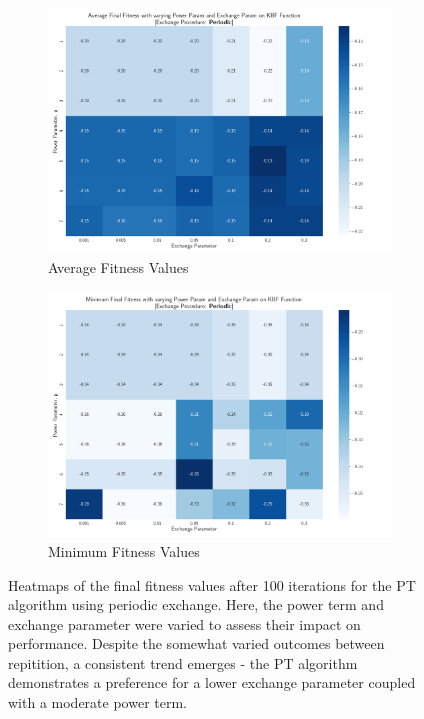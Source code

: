 \documentclass[10pt]{article}
\begin{document}
\begin{multicols}{2}
\begin{figure}[H]
    \centering
    \begin{subfigure}{0.46\textwidth}
        \centering
        \includegraphics[width=\textwidth]{../figures/Permanent Images/PT_Avg_Fitness_Heatmap_Periodic.png}
        \caption{Average Fitness Values}
        \label{fig:avg_periodic_heatmap}
    \end{subfigure}
    \begin{subfigure}{0.46\textwidth}
        \centering
        \includegraphics[width=\textwidth]{../figures/Permanent Images/PT_Min_Fitness_Heatmap_Periodic.png}
        \caption{Minimum Fitness Values}
        \label{fig:min_periodic_heatmap}
    \end{subfigure}
    \captionsetup{justification=centering}
    \caption{Heatmaps of the final fitness values after 100 iterations for the PT algorithm using periodic exchange. Here, the power term and exchange parameter were varied to assess their impact on performance. Despite the somewhat varied outcomes between repitition, a consistent trend emerges - the PT algorithm demonstrates a preference for a lower exchange parameter coupled with a moderate power term.}
    \label{fig:heatmap_periodic}
\end{figure}


\end{multicols}
\end{document}
